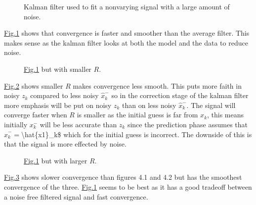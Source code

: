 \documentclass[letterpaper,10pt,english]{jupyterBook}
\begin{document}
\begin{figure}[htbp]
\centering
\capstart

\noindent{}
\caption{Kalman filter used to fit a non\sphinxhyphen{}varying signal with a large amount of noise.}\label{\detokenize{3ExampleBatteryOutput:fig-kalman-constant}}\end{figure}

\sphinxAtStartPar
\hyperref[\detokenize{3ExampleBatteryOutput:fig-kalman-constant}]{Fig.\@ \ref{\detokenize{3ExampleBatteryOutput:fig-kalman-constant}}} shows that convergence is faster and smoother than the average filter. This makes sense as the kalman filter looks at both the model and the data to reduce noise.

\begin{figure}[htbp]
\centering
\capstart

\noindent{}
\caption{\hyperref[\detokenize{3ExampleBatteryOutput:fig-kalman-constant}]{Fig.\@ \ref{\detokenize{3ExampleBatteryOutput:fig-kalman-constant}}} but with smaller \(R\).}\label{\detokenize{3ExampleBatteryOutput:fig-small-r}}\end{figure}

\sphinxAtStartPar
\hyperref[\detokenize{3ExampleBatteryOutput:fig-small-r}]{Fig.\@ \ref{\detokenize{3ExampleBatteryOutput:fig-small-r}}} shows smaller \(R\) makes convergence less smooth. This puts more faith in noisy \(z_k\) compared to less noisy \(\hat{x}^-_k\) so in the correction stage of the kalman filter more emphasis will be put on noisy \(z_k\) than on less noisy \(\hat{x}^-_k\). The signal will converge faster when \(R\) is smaller as the initial guess is far from \(x_k\), this means initially \(x^-_k\) will be less accurate than \(z_k\) since the prediction phase assumes that \(\hat{x}^-_{k} = \)\textbackslash{}hat\{x\sphinxhyphen{}1\}\_k\$ which for the initial guess is incorrect. The downside of this is that the signal is more effected by noise.

\begin{figure}[htbp]
\centering
\capstart

\noindent{}
\caption{\hyperref[\detokenize{3ExampleBatteryOutput:fig-kalman-constant}]{Fig.\@ \ref{\detokenize{3ExampleBatteryOutput:fig-kalman-constant}}} but with larger \(R\).}\label{\detokenize{3ExampleBatteryOutput:fig-larger-r}}\end{figure}

\sphinxAtStartPar
\hyperref[\detokenize{3ExampleBatteryOutput:fig-larger-r}]{Fig.\@ \ref{\detokenize{3ExampleBatteryOutput:fig-larger-r}}} shows slower convergence than figures 4.1 and 4.2 but has the smoothest convergence of the three. \hyperref[\detokenize{3ExampleBatteryOutput:fig-kalman-constant}]{Fig.\@ \ref{\detokenize{3ExampleBatteryOutput:fig-kalman-constant}}} seems to be best as it has a good tradeoff between a noise free filtered signal and fast convergence.
\end{document}
